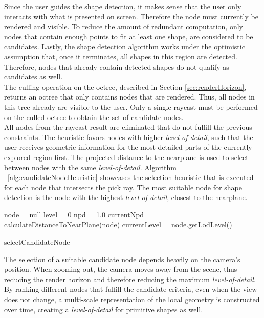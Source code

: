Since the user guides the shape detection, it makes sense that the user only interacts with what is presented on screen. Therefore the node must currently be rendered and visible. To reduce the amount of redundant computation, only nodes that contain enough points to fit at least one shape, are considered to be candidates. Lastly, the shape detection algorithm works under the optimistic assumption that, once it terminates, all shapes in this region are detected. Therefore, nodes that already contain detected shapes do not qualify as candidates as well. 
\\
The culling operation on the octree, described in Section \ref{sec:renderHorizon}, returns an octree that only contains nodes that are rendered. Thus, all nodes in this tree already are visible to the user. Only a single raycast must be performed on the culled octree to obtain the set of candidate nodes. 
\\
All nodes from the raycast result are eliminated that do not fulfill the previous constraints. The heuristic favors nodes with higher \textit{level-of-detail}, such that the user receives geometric information for the most detailed parts of the currently explored region first. The projected distance to the nearplane is used to select between nodes with the same \textit{level-of-detail}. Algorithm ~\ref{alg:candidateNodeHeuristic} showcases the selection heuristic that is executed for each node that intersects the pick ray. The most suitable node for shape detection is the node with the highest \textit{level-of-detail}, closest to the nearplane. 

\begin{algorithm}
    
    node     = null\;
    level = 0\;
    npd     = 1.0\;
    {            
        currentNpd = calculateDistanceToNearPlane(node)    \;
        currentLevel = node.getLodLevel()\;
    }
\caption[A heuristic that chooses the most suitable candidate node]{selectCandidateNode}
\label{alg:candidateNodeHeuristic}
\end{algorithm}

The selection of a suitable candidate node depends heavily on the camera's position. When zooming out, the camera moves away from the scene, thus reducing the render horizon and therefore reducing the maximum \textit{level-of-detail}. By ranking different nodes that fulfill the candidate criteria, even when the view does not change, a multi-scale representation of the local geometry is constructed over time, creating a \textit{level-of-detail} for primitive shapes as well. 


